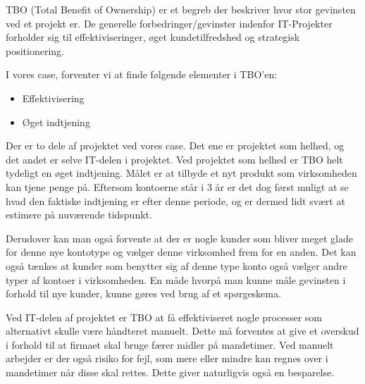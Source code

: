 TBO (Total Benefit of Ownership) er et begreb der beskriver hvor stor gevinsten
ved et projekt er. De generelle forbedringer/gevinster indenfor IT-Projekter
forholder sig til effektiviseringer, øget kundetilfredshed og strategisk
positionering.

I vores case, forventer vi at finde følgende elementer i TBO'en:

\begin{itemize}
  \item Effektivisering
  \item Øget indtjening
\end{itemize}

Der er to dele af projektet ved vores case. Det ene er projektet som helhed, og
det andet er selve IT-delen i projektet. Ved projektet som helhed er TBO helt
tydeligt en øget indtjening. Målet er at tilbyde et nyt produkt som virksomheden
kan tjene penge på. Eftersom kontoerne står i 3 år er det dog først muligt at
se hvad den faktiske indtjening er efter denne periode, og er dermed lidt svært
at estimere på nuværende tidspunkt.

Derudover kan man også forvente at der er nogle kunder som bliver meget glade
for denne nye kontotype og vælger denne virksomhed frem for en anden. Det kan
også tænkes at kunder som benytter sig af denne type konto også vælger andre
typer af kontoer i virksomheden. En måde hvorpå man kunne måle gevinsten i
forhold til nye kunder, kunne gøres ved brug af et spørgeskema.

Ved IT-delen af projektet er TBO at få effektiviseret nogle processer som
alternativt skulle være håndteret manuelt. Dette må forventes at give et
overskud i forhold til at firmaet skal bruge færer midler på mandetimer. Ved
manuelt arbejder er der også risiko for fejl, som mere eller mindre kan regnes
over i mandetimer når disse skal rettes. Dette giver naturligvis også en
besparelse.
